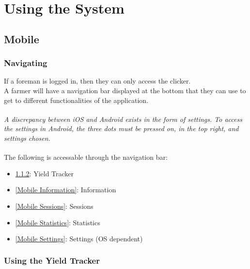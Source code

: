 \documentclass[11pt]{article}
\begin{document}
\newpage
\section{Using the System}

\subsection{Mobile}
\subsubsection{Navigating}
If a foreman is logged in, then they can only access the clicker.\\
A farmer will have a navigation bar displayed at the bottom that they can use to get to different functionalities of the application.\\
\\
\textit{A discrepancy between iOS and Android exists in the form of settings. To access the settings in Android, the three dots must be pressed on, in the top right, and settings chosen.}\\
\\
The following is accessable through the navigation bar:
\begin{itemize}
\item \ref{Mobile Yield Tracker}: Yield Tracker
\item \ref{Mobile Information}: Information
\item \ref{Mobile Sessions}: Sessions 
\item \ref{Mobile Statistics}: Statistics
\item \ref{Mobile Settings}: Settings (OS dependent)
\end{itemize}
\subsubsection{Using the Yield Tracker}
\label{Mobile Yield Tracker}
\end{document}
